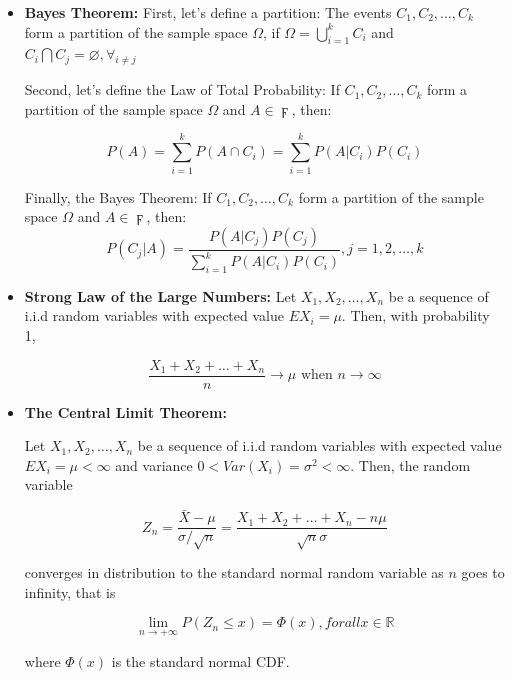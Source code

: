 \begin{itemize}
    \item \textbf{Bayes Theorem:}
    First, let's define a partition:
    The events $C_1, C_2, \dots, C_k$ form a partition of the sample space $\Omega$, if $\Omega = \bigcup^k_{i=1}C_i$ and $C_i \bigcap C_j = \varnothing, \forall_{i \neq j}$
    
    Second, let's define the Law of Total Probability:
    If $C_1, C_2, \dots, C_k$ form a partition of the sample space $\Omega$ and $A \in \digamma$, then:
    
    \begin{equation}
        P(A) = \sum^{k}_{i=1}P(A \cap C_i) = \sum^{k}_{i=1}P(A|C_i)P(C_i)
    \end{equation}
    
    Finally, the Bayes Theorem:
    If $C_1, C_2, \dots, C_k$ form a partition of the sample space $\Omega$ and $A \in \digamma$, then:
    \begin{equation}
        P(C_j|A) = \frac{P(A|C_j)P(C_j)}{\sum^{k}_{i=1}P(A|C_i)P(C_i)}, j=1, 2, \dots, k
    \end{equation}

    \item \textbf{Strong Law of the Large Numbers:}
    Let $X_1, X_2, \dots, X_n$ be a sequence of i.i.d random variables with expected value $EX_i = \mu$. Then, with probability 1, 
    
    \begin{equation}
        \frac{X_1 + X_2 + \dots + X_n}{n} \to \mu \text{ when } n \to \infty
    \end{equation}
    
    \item \textbf{The Central Limit Theorem:}
    
    Let $X_1, X_2, \dots, X_n$ be a sequence of i.i.d random variables with expected value $EX_i = \mu < \infty$ and variance $0 < Var(X_i) = \sigma^2 < \infty$. Then, the random variable
    
    \begin{equation}
        Z_n = \frac{\bar{X} - \mu}{\sigma/\sqrt{n}} = \frac{X_1 + X_2 + \dots + X_n - n\mu}{\sqrt{n}\sigma}
    \end{equation}
  
    converges in distribution to the standard normal random variable as $n$ goes to infinity, that is
    
    \begin{equation}
        \lim_{n \to +\infty} P(Z_n \leq x) = \Phi (x), for all x \in \mathbb{R}
    \end{equation}
    
    where $\Phi (x)$ is the standard normal CDF.

\end{itemize}

